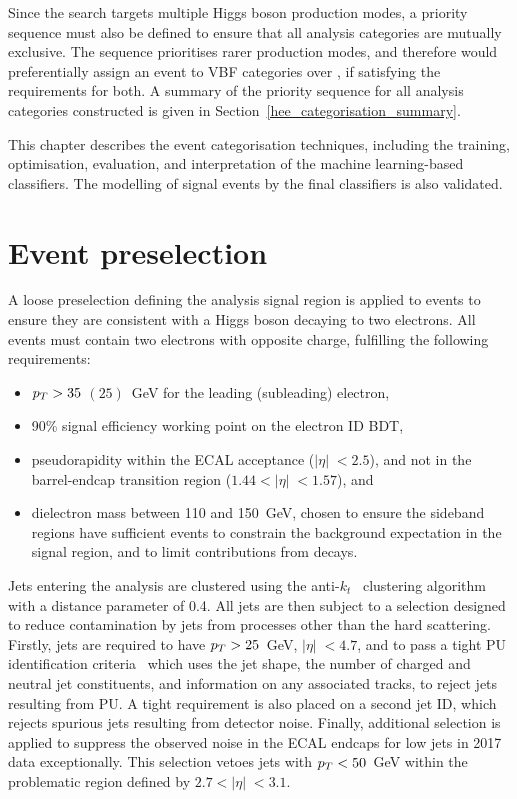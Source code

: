 Since the search targets multiple Higgs boson production modes, a priority sequence must also be defined to ensure that all analysis categories are mutually exclusive. The sequence prioritises rarer production modes, and therefore would preferentially assign an event to VBF categories over \ggH, if satisfying the requirements for both. A summary of the priority sequence for all analysis categories constructed is given in Section~\ref{hee_categorisation_summary}.

This chapter describes the event categorisation techniques, including the training, optimisation, evaluation, and interpretation of the machine learning-based classifiers. The modelling of signal events by the final classifiers is also validated.



\section{Event preselection}
\label{subsec:hee_preselection}

A loose preselection defining the analysis signal region is applied to events to ensure they are consistent with a Higgs boson decaying to two electrons. All events must contain two electrons with opposite charge, fulfilling the following requirements:

\begin{itemize}
    \item $p_T > 35$ $(25)$~GeV for the leading (subleading) electron,
    \item 90\% signal efficiency working point on the electron ID BDT,
    \item pseudorapidity within the ECAL acceptance ($|\eta|\;<2.5$), and not in the barrel-endcap transition region ($1.44<|\eta|\;<1.57$), and
    \item dielectron mass between 110 and 150~GeV, chosen to ensure the \mee sideband regions have sufficient events to constrain the background expectation in the signal region, and to limit contributions from \Zee decays.
\end{itemize}

\noindent Jets entering the analysis are clustered using the anti-$k_{t}$~\cite{anti-kt} clustering algorithm with a distance parameter of 0.4. All jets are then subject to a selection designed to reduce contamination by jets from processes other than the hard scattering. Firstly, jets are required to have $p_T>25$~GeV, $|\eta|\; < 4.7$, and to pass a tight PU identification criteria~\cite{PUJID} which uses the jet shape, the number of charged and neutral jet constituents, and information on any associated tracks, to reject jets resulting from PU. %
A tight requirement is also placed on a second jet ID, which rejects spurious jets resulting from detector noise. Finally, additional selection is applied to suppress the observed noise in the ECAL endcaps for low \pt jets in 2017 data exceptionally. This selection vetoes jets with $p_T<50$~GeV within the problematic region defined by $2.7<|\eta|\;<3.1$.



